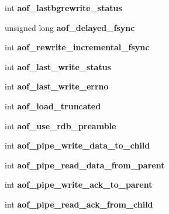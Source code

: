 \begin{DoxyCompactItemize}
\item 
\mbox{\label{structredisServer_ae49c6cf5d24755cdaafde9afcbe7fa05}} 
int {\bfseries aof\+\_\+lastbgrewrite\+\_\+status}
\item 
\mbox{\label{structredisServer_a2f1c197d7a48183d9bda5fb46b166337}} 
unsigned long {\bfseries aof\+\_\+delayed\+\_\+fsync}
\item 
\mbox{\label{structredisServer_aab7c66eff4db8a731e8e16b336d52b92}} 
int {\bfseries aof\+\_\+rewrite\+\_\+incremental\+\_\+fsync}
\item 
\mbox{\label{structredisServer_a27ab54518796d13294be583b8b1e4f3d}} 
int {\bfseries aof\+\_\+last\+\_\+write\+\_\+status}
\item 
\mbox{\label{structredisServer_aa9e1f17afffdc9b216ed09a0d8f25ab0}} 
int {\bfseries aof\+\_\+last\+\_\+write\+\_\+errno}
\item 
\mbox{\label{structredisServer_a6dded064b48430f0c08ff9f96801587b}} 
int {\bfseries aof\+\_\+load\+\_\+truncated}
\item 
\mbox{\label{structredisServer_a0501b0eef63d972c364a247e091d8024}} 
int {\bfseries aof\+\_\+use\+\_\+rdb\+\_\+preamble}
\item 
\mbox{\label{structredisServer_a067bfaa57ccd1fa13c5185bb1c7f8c49}} 
int {\bfseries aof\+\_\+pipe\+\_\+write\+\_\+data\+\_\+to\+\_\+child}
\item 
\mbox{\label{structredisServer_a4172e619ab3c1c7664972799c0066220}} 
int {\bfseries aof\+\_\+pipe\+\_\+read\+\_\+data\+\_\+from\+\_\+parent}
\item 
\mbox{\label{structredisServer_a6c0d0955ed07e06f37f2e6f922f0ebb8}} 
int {\bfseries aof\+\_\+pipe\+\_\+write\+\_\+ack\+\_\+to\+\_\+parent}
\item 
\mbox{\label{structredisServer_aeb1a84843eb8b4302a141e752ce86f10}} 
int {\bfseries aof\+\_\+pipe\+\_\+read\+\_\+ack\+\_\+from\+\_\+child}

\end{DoxyCompactItemize}

